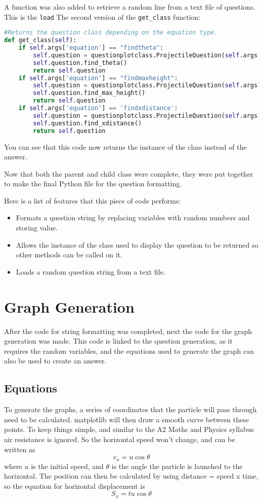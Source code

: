 A function was also added to retrieve a random line from a text file of questions. This is the \texttt{load} 
The second version of the \texttt{get\_class} function:
\begin{lstlisting}[language=Python, caption=Second iteration of the get\_class function]
#Returns the question class depending on the equation type.
def get_class(self):
	if self.args['equation'] == "findtheta":
		self.question = questionplotclass.ProjectileQuestion(self.args['b'], self.args['a'], random.randint(40, 60))
		self.question.find_theta()
		return self.question
	if self.args['equation'] == "findmaxheight":
		self.question = questionplotclass.ProjectileQuestion(self.args['c'], self.args['a'], self.args['b'])
		self.question.find_max_height()
		return self.question
	if self.args['equation'] == 'findxdistance':
		self.question = questionplotclass.ProjectileQuestion(self.args['c'], self.args['a'], self.args['b'])
		self.question.find_xdistance()
		return self.question
\end{lstlisting}
You can see that this code now returns the instance of the class instead of the answer.

Now that both the parent and child class were complete, they were put together to make the final Python file for the question formatting.

Here is a list of features that this piece of code performs:
\begin{itemize}
	\item Formats a question string by replacing variables with random numbers and storing value.
	\item Allows the instance of the class used to display the question to be returned so other methods can be called on it.
	\item Loads a random question string from a text file.
\end{itemize} 
\section{Graph Generation}
After the code for string formatting was completed, next the code for the graph generation was made. This code is linked to the question generation, as it requires the random variables, and the equations used to generate the graph can also be used to create an answer.
\subsection{Equations}
To generate the graphs, a series of coordinates that the particle will pass through need to be calculated. matplotlib will then draw a smooth curve between these points. To keep things simple, and similar to the A2 Maths and Physics syllabus air resistance is ignored. So the horizontal speed won't change, and can be written as \[v_x = u\cos\theta\] where $u$ is the initial speed, and $\theta$ is the angle the particle is launched to the horizontal. The position can then be calculated by using distance = speed x time, so the equation for horizontal displacement is \[S_x = tu\cos\theta\]

